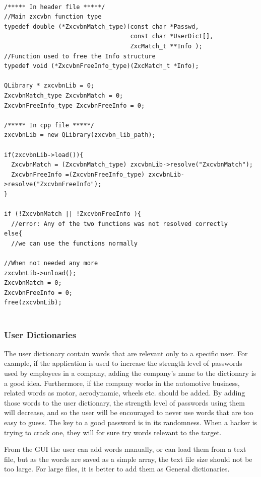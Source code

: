 \begin{lstlisting}[style=customc, float=htb, caption={Qlibrary basic usage}, label = {lis:qlibrary:}]

/***** In header file *****/
//Main zxcvbn function type
typedef double (*ZxcvbnMatch_type)(const char *Passwd, 
                                   const char *UserDict[], 
                                   ZxcMatch_t **Info );
//Function used to free the Info structure
typedef void (*ZxcvbnFreeInfo_type)(ZxcMatch_t *Info);

QLibrary * zxcvbnLib = 0;
ZxcvbnMatch_type ZxcvbnMatch = 0;
ZxcvbnFreeInfo_type ZxcvbnFreeInfo = 0;

/***** In cpp file *****/     
zxcvbnLib = new QLibrary(zxcvbn_lib_path);
    
if(zxcvbnLib->load()){
  ZxcvbnMatch = (ZxcvbnMatch_type) zxcvbnLib->resolve("ZxcvbnMatch");
  ZxcvbnFreeInfo =(ZxcvbnFreeInfo_type) zxcvbnLib->resolve("ZxcvbnFreeInfo");
}

if (!ZxcvbnMatch || !ZxcvbnFreeInfo ){
  //error: Any of the two functions was not resolved correctly
else{
  //we can use the functions normally
  
//When not needed any more
zxcvbnLib->unload();
ZxcvbnMatch = 0;
ZxcvbnFreeInfo = 0;
free(zxcvbnLib);  
  
\end{lstlisting}


\subsubsection{User Dictionaries}

The user dictionary contain words that are relevant only to a specific user. For example, if the application is used to increase the strength level of passwords used by employees in a company, adding the company's name to the dictionary is a good idea. Furthermore, if the company works in the automotive business, related words as motor, aerodynamic, wheels etc. should be added. By adding those words to the user dictionary, the strength level of passwords using them will decrease, and so the user will be encouraged to never use words that are too easy to guess. The key to a good password is in its randomness. When a hacker is trying to crack one, they will for sure try words relevant to the target.

From the GUI the user can add words manually, or can load them from a text file, but as the words are saved as a simple array, the text file size should not be too large. For large files, it is better to add them as General dictionaries.

